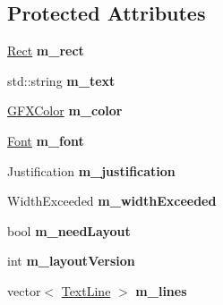 \subsection*{Protected Attributes}
\begin{DoxyCompactItemize}
\item 
\hyperlink{classRect}{Rect} {\bfseries m\+\_\+rect}\hypertarget{classPaintText_aeeeb9cfe0234c3e87f83178254444996}{}\label{classPaintText_aeeeb9cfe0234c3e87f83178254444996}

\item 
std\+::string {\bfseries m\+\_\+text}\hypertarget{classPaintText_af06ec05c247afcc2d25d92044ed69cd4}{}\label{classPaintText_af06ec05c247afcc2d25d92044ed69cd4}

\item 
\hyperlink{structGFXColor}{G\+F\+X\+Color} {\bfseries m\+\_\+color}\hypertarget{classPaintText_a7a08efed5eacf73d585a89af456e4ec3}{}\label{classPaintText_a7a08efed5eacf73d585a89af456e4ec3}

\item 
\hyperlink{classFont}{Font} {\bfseries m\+\_\+font}\hypertarget{classPaintText_a5280934c15dde564328863770767f440}{}\label{classPaintText_a5280934c15dde564328863770767f440}

\item 
Justification {\bfseries m\+\_\+justification}\hypertarget{classPaintText_ad818a792579ef1d26048880634631e57}{}\label{classPaintText_ad818a792579ef1d26048880634631e57}

\item 
Width\+Exceeded {\bfseries m\+\_\+width\+Exceeded}\hypertarget{classPaintText_aa1a9906efeb18593b7c2233b2a757ce1}{}\label{classPaintText_aa1a9906efeb18593b7c2233b2a757ce1}

\item 
bool {\bfseries m\+\_\+need\+Layout}\hypertarget{classPaintText_a282db679f0887592704fc2d37cd3bc3b}{}\label{classPaintText_a282db679f0887592704fc2d37cd3bc3b}

\item 
int {\bfseries m\+\_\+layout\+Version}\hypertarget{classPaintText_ad77329d91d00fe7f77e6346e43d7fb61}{}\label{classPaintText_ad77329d91d00fe7f77e6346e43d7fb61}

\item 
vector$<$ \hyperlink{structPaintText_1_1TextLine}{Text\+Line} $>$ {\bfseries m\+\_\+lines}\hypertarget{classPaintText_a9d86badb38e4950197703a89ae3a5145}{}\label{classPaintText_a9d86badb38e4950197703a89ae3a5145}


\end{DoxyCompactItemize}
